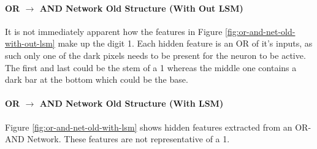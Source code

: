 \noindent
\begin{minipage}[t]{0.45\textwidth}
	\vspace{0px}
	\paragraph{OR $\rightarrow$ AND Network Old Structure (With Out LSM)}
	It is not immediately apparent how the features in Figure \ref{fig:or-and-net-old-with-out-lsm} make up the digit 1. Each hidden feature is an OR of it's inputs, as such only one of the dark pixels needs to be present for the neuron to be active. The first and last could be the stem of a 1 whereas the middle one contains a dark bar at the bottom which could be the base.\\

	\paragraph{OR $\rightarrow$ AND Network Old Structure (With LSM)}
	Figure \ref{fig:or-and-net-old-with-lsm} shows hidden features extracted from an OR-AND Network. These features are not representative of a 1.

\end{minipage}
\hspace{0.1\textwidth}
